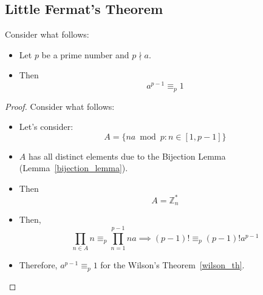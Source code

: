 \subsection{Little Fermat's Theorem}\label{little_fermat_th}
\begin{theorem}
    Consider what follows:
    \begin{itemize}
        \item Let $p$ be a prime number and $p \nmid a$.
        \item Then \[a^{p-1} \equiv_{p} 1\]
    \end{itemize}
\end{theorem}
\begin{proof}
    Consider what follows:
    \begin{itemize}
        \item Let's consider: \[A = \{na \bmod p: n \in [1, p-1]\}\]
        \item $A$ has all distinct elements due to the Bijection Lemma (Lemma~\ref{bijection_lemma}).
        \item Then \[A = \mathbb{Z}_{n}^{*}\]
        \item Then, \[\prod\limits_{n \in A} n \equiv_{p} \prod\limits_{n=1}^{p-1} na \implies (p-1)! \equiv_{p} (p-1)!a^{p-1}\]
        \item Therefore, $a^{p-1} \equiv_{p} 1$ for the Wilson's Theorem~\ref{wilson_th}.
    \end{itemize}
\end{proof}

